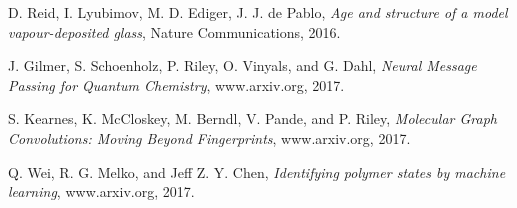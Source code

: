 \documentclass[12pt,reqno]{amsart}
\numberwithin{equation}{section}
\begin{document}
\begin{thebibliography}{Al-F11}
D. Reid, I. Lyubimov, M. D. Ediger, J. J. de Pablo, \textit{Age and structure of a model vapour-deposited glass}, Nature Communications, 2016. 

 J. Gilmer, S. Schoenholz, P. Riley, O. Vinyals, and G. Dahl, \textit{Neural Message Passing for Quantum Chemistry}, www.arxiv.org, 2017.  

S. Kearnes, K. McCloskey, M. Berndl, V. Pande, and P. Riley, \textit{Molecular Graph Convolutions: Moving Beyond Fingerprints}, www.arxiv.org, 2017.

Q. Wei, R. G. Melko, and Jeff Z. Y. Chen, \textit{Identifying polymer states by machine learning}, www.arxiv.org, 2017.  

\end{thebibliography}
\end{document}
